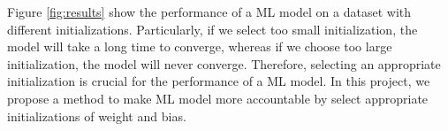 Figure \ref{fig:results} show the performance of a ML model on a dataset with different initializations. Particularly, if we select too small initialization, the model will take a long time to converge, whereas if we choose too large initialization, the model will never converge. Therefore, selecting an appropriate initialization is crucial for the performance of a ML model. In this project, we propose a method to make ML model more accountable by select appropriate initializations of weight and bias. 
%
%
%
%
%
